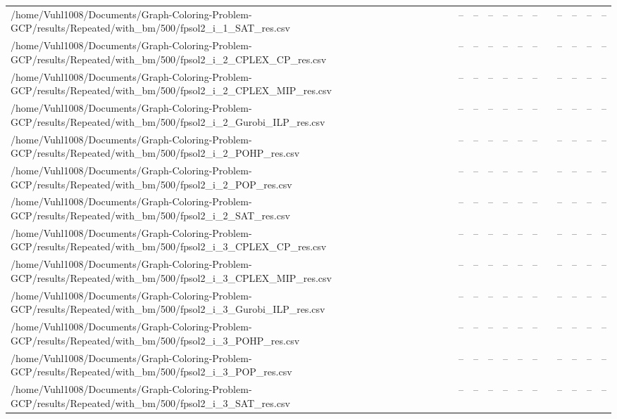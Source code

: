 \begin{table}[htbp]
\begin{tabular}{llllllllllll}
/home/Vuhl1008/Documents/Graph-Coloring-Problem-GCP/results/Repeated/with\_bm/500/fpsol2\_i\_1\_SAT\_res.csv & -- & -- & -- & -- & -- & -- & {} & -- & -- & -- & -- \\
/home/Vuhl1008/Documents/Graph-Coloring-Problem-GCP/results/Repeated/with\_bm/500/fpsol2\_i\_2\_CPLEX\_CP\_res.csv & -- & -- & -- & -- & -- & -- & {} & -- & -- & -- & -- \\
/home/Vuhl1008/Documents/Graph-Coloring-Problem-GCP/results/Repeated/with\_bm/500/fpsol2\_i\_2\_CPLEX\_MIP\_res.csv & -- & -- & -- & -- & -- & -- & {} & -- & -- & -- & -- \\
/home/Vuhl1008/Documents/Graph-Coloring-Problem-GCP/results/Repeated/with\_bm/500/fpsol2\_i\_2\_Gurobi\_ILP\_res.csv & -- & -- & -- & -- & -- & -- & {} & -- & -- & -- & -- \\
/home/Vuhl1008/Documents/Graph-Coloring-Problem-GCP/results/Repeated/with\_bm/500/fpsol2\_i\_2\_POHP\_res.csv & -- & -- & -- & -- & -- & -- & {} & -- & -- & -- & -- \\
/home/Vuhl1008/Documents/Graph-Coloring-Problem-GCP/results/Repeated/with\_bm/500/fpsol2\_i\_2\_POP\_res.csv & -- & -- & -- & -- & -- & -- & {} & -- & -- & -- & -- \\
/home/Vuhl1008/Documents/Graph-Coloring-Problem-GCP/results/Repeated/with\_bm/500/fpsol2\_i\_2\_SAT\_res.csv & -- & -- & -- & -- & -- & -- & {} & -- & -- & -- & -- \\
/home/Vuhl1008/Documents/Graph-Coloring-Problem-GCP/results/Repeated/with\_bm/500/fpsol2\_i\_3\_CPLEX\_CP\_res.csv & -- & -- & -- & -- & -- & -- & {} & -- & -- & -- & -- \\
/home/Vuhl1008/Documents/Graph-Coloring-Problem-GCP/results/Repeated/with\_bm/500/fpsol2\_i\_3\_CPLEX\_MIP\_res.csv & -- & -- & -- & -- & -- & -- & {} & -- & -- & -- & -- \\
/home/Vuhl1008/Documents/Graph-Coloring-Problem-GCP/results/Repeated/with\_bm/500/fpsol2\_i\_3\_Gurobi\_ILP\_res.csv & -- & -- & -- & -- & -- & -- & {} & -- & -- & -- & -- \\
/home/Vuhl1008/Documents/Graph-Coloring-Problem-GCP/results/Repeated/with\_bm/500/fpsol2\_i\_3\_POHP\_res.csv & -- & -- & -- & -- & -- & -- & {} & -- & -- & -- & -- \\
/home/Vuhl1008/Documents/Graph-Coloring-Problem-GCP/results/Repeated/with\_bm/500/fpsol2\_i\_3\_POP\_res.csv & -- & -- & -- & -- & -- & -- & {} & -- & -- & -- & -- \\
/home/Vuhl1008/Documents/Graph-Coloring-Problem-GCP/results/Repeated/with\_bm/500/fpsol2\_i\_3\_SAT\_res.csv & -- & -- & -- & -- & -- & -- & {} & -- & -- & -- & -- \\

\end{tabular}
\end{table}
